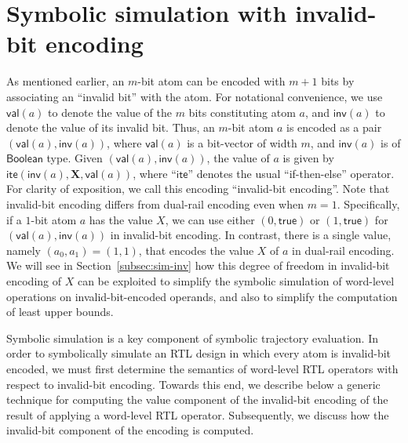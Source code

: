 \documentclass{llncs}
\newcommand{\val}{\ensuremath{\mathsf{val}}}
\newcommand{\inv}{\ensuremath{\mathsf{inv}}}
\newcommand{\ite}{\ensuremath{\mathsf{ite}}}
\newcommand{\true}{\ensuremath{\mathsf{true}}}
\begin{document}
\section{Symbolic simulation with invalid-bit encoding}\label{sec:encoding}
As mentioned earlier, an $m$-bit atom can be encoded with $m+1$ bits
by associating an ``invalid bit'' with the atom.  For notational
convenience, we use ${\val}(a)$ to denote the value of the $m$ bits
constituting atom $a$, and ${\inv}(a)$ to denote the value of its
invalid bit.  Thus, an $m$-bit atom $a$ is encoded as a pair
$({\val}(a), {\inv}(a))$, where ${\val}(a)$ is a bit-vector of width
$m$, and ${\inv}(a)$ is of $\mathsf{Boolean}$ type.  Given
$({\val}(a), {\inv}(a))$, the value of $a$ is given by
${\ite}({\inv}(a), \mathbf{X}, {\val}(a))$, where ``${\ite}$'' denotes
the usual ``if-then-else'' operator.  For clarity of exposition, we
call this encoding ``invalid-bit encoding''.  Note that invalid-bit
encoding differs from dual-rail encoding even when $m=1$.
Specifically, if a $1$-bit atom $a$ has the value $X$, we can use
either $(0, \true)$ or $(1, \true)$ for $({\val}(a), {\inv}(a))$ in
invalid-bit encoding.  In contrast, there is a single value, namely
$(a_0, a_1) = (1,1)$, that encodes the value $X$ of $a$ in dual-rail
encoding.  We will see in Section~\ref{subsec:sim-inv} how this degree
of freedom in invalid-bit encoding of $X$ can be exploited to simplify
the symbolic simulation of word-level operations on
invalid-bit-encoded operands, and also to simplify the computation of
least upper bounds.

Symbolic simulation is a key component of symbolic trajectory
evaluation.  In order to symbolically simulate an RTL design in which
every atom is invalid-bit encoded, we must first determine the
semantics of word-level RTL operators with respect to invalid-bit
encoding.  Towards this end, we describe below a generic technique for
computing the value component of the invalid-bit encoding of the
result of applying a word-level RTL operator.  Subsequently, we
discuss how the invalid-bit component of the encoding is computed.
\end{document}

